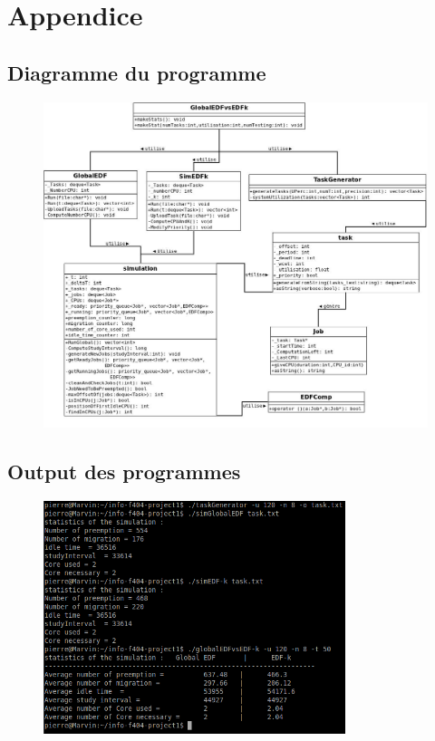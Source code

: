 \documentclass[a4paper,10pt]{article}
\begin{document}
\pagebreak
\section{Appendice}
	
	
	  	
	 \subsection{Diagramme du programme}
		\begin{figure}[H] \hspace*{-2cm} 
    	\centering
   		  \includegraphics[width=350pt]{DiagUML.jpeg} 
	  	\end{figure}
	  
	 \subsection{Output des programmes}
		\begin{figure}[H] \hspace*{-2cm} 
    	\centering
   		  \includegraphics[width=250pt]{output4.png} 
	  	\end{figure}
	  	
\end{document}
